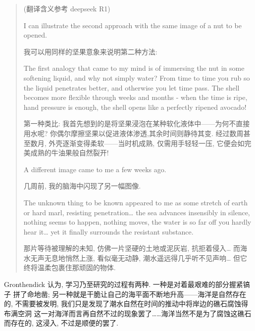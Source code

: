 \documentclass[UTF8]{book}
\begin{document}
\begin{quotation}

(翻译含义参考 deepseek R1)

\kaishu

I can illustrate the second approach with the same image of a nut to be opened.

我可以用同样的坚果意象来说明第二种方法: 

The first analogy that came to my mind is of immersing the nut in some 
softening liquid, and why not simply water? 
From time to time you rub so the liquid penetrates better, 
and otherwise you let time pass. 
The shell becomes more flexible through weeks and months - 
when the time is ripe, 
hand pressure is enough, the shell opens like a perfectly ripened avocado! 

第一种类比: 
我首先想到的是将坚果浸泡在某种软化液体中——为何不直接用水呢? 
你偶尔摩擦坚果以促进液体渗透,其余时间则静待其变. 
经过数周甚至数月, 外壳逐渐变得柔软——当时机成熟, 仅需用手轻轻一压, 
它便会如完美成熟的牛油果般自然裂开! 

A different image came to me a few weeks ago.

几周前, 我的脑海中闪现了另一幅图像. 

The unknown thing to be known appeared to me as some stretch of earth 
or hard marl, resisting penetration\dots
the sea advances insensibly in silence, 
nothing seems to happen, nothing moves, 
the water is so far off you hardly hear it\dots 
yet it finally surrounds the resistant substance.

那片等待被理解的未知, 仿佛一片坚硬的土地或泥灰岩, 抗拒着侵入\dots
而海水无声无息地悄然上涨, 看似毫无动静, 潮水遥远得几乎听不见声响\dots 
但它终将温柔包裹住那顽固的物体. 

\end{quotation}

\songti

Gronthendick 认为, 学习乃至研究的过程有两种. 一种是对着最艰难的部分握紧镐子
拼了命地凿; 另一种就是干脆让自己的海平面不断地升高——海洋是自然存在的, 
不需要被发明, 我们只是发现了潮水自然在时间的推动中将岸边的礁石腐蚀得布满空洞
这一对海洋而言再自然不过的现象罢了\dots\dots 海洋当然不是为了腐蚀这礁石而存在的, 
这浸入, 不过是顺便的罢了. 

\end{document}
